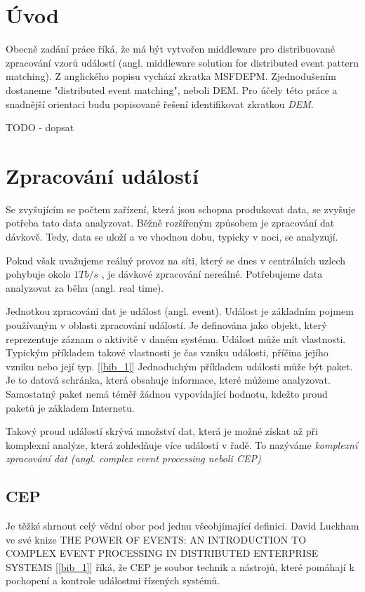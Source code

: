 \documentclass[
  digital, %
  table,   %
  nolof,     %
  nolot,     %
  oneside, %
  nocover,
  monochrome,
  12pt
]{fithesis3}
\begin{document}
\chapter{Úvod}

Obecně zadání práce říká, že má být vytvořen middleware pro distribuované zpracování vzorů událostí (angl. middleware solution for distributed event pattern matching). Z anglického popisu vychází zkratka MSFDEPM. Zjednodušením dostaneme "distributed event matching", neboli DEM. Pro účely této práce a snadnější orientaci budu popisované řešení identifikovat zkratkou \textit{DEM}.

TODO - dopsat

\chapter{Zpracování událostí}
Se zvyšujícím se počtem zařízení, která jsou schopna produkovat data, se zvyšuje potřeba tato data analyzovat. Běžně rozšířeným způsobem je zpracování dat dávkově. Tedy, data se uloží a ve vhodnou dobu, typicky v noci, se analyzují.

Pokud však uvažujeme reálný provoz na síti, který se dnes v centrálních uzlech pohybuje okolo $1 Tb/s$ 
, je dávkové zpracování nereálné. Potřebujeme data analyzovat za běhu (angl. real time).

Jednotkou zpracování dat je událost (angl. event). Událost je základním pojmem používaným v oblasti zpracování událostí. Je definována jako objekt, který reprezentuje záznam o aktivitě v daném systému. Událost může mít vlastnosti. Typickým příkladem takové vlastnosti je čas vzniku události, příčina jejího vzniku nebo její typ. [\ref{bib_1}] Jednoduchým příkladem události může být paket. Je to datová schránka, která obsahuje informace, které můžeme analyzovat. Samostatný paket nemá téměř žádnou vypovídající hodnotu, kdežto proud paketů je základem Internetu.

Takový proud událostí skrývá množství dat, která je možné získat až při komplexní analýze, která zohledňuje více událostí v řadě. To nazýváme \textit{komplexní zpracování dat (angl. complex event processing neboli CEP)}


\section{CEP}

Je těžké shrnout celý vědní obor pod jednu všeobjímající definici. David Luckham ve své knize  THE POWER OF EVENTS: AN INTRODUCTION TO COMPLEX EVENT PROCESSING IN DISTRIBUTED ENTERPRISE SYSTEMS [\ref{bib_1}] říká, že CEP je soubor technik a nástrojů, které pomáhají k pochopení a kontrole událostmi řízených systémů.
\end{document}
